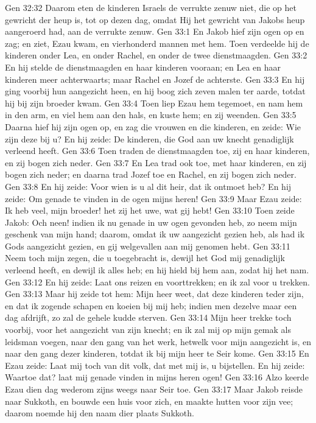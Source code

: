 Gen 32:32  Daarom eten de kinderen Israels de verrukte zenuw niet, die op het gewricht der heup is, tot op dezen dag, omdat Hij het gewricht van Jakobs heup aangeroerd had, aan de verrukte zenuw.
Gen 33:1  En Jakob hief zijn ogen op en zag; en ziet, Ezau kwam, en vierhonderd mannen met hem. Toen verdeelde hij de kinderen onder Lea, en onder Rachel, en onder de twee dienstmaagden.
Gen 33:2  En hij stelde de dienstmaagden en haar kinderen vooraan; en Lea en haar kinderen meer achterwaarts; maar Rachel en Jozef de achterste.
Gen 33:3  En hij ging voorbij hun aangezicht heen, en hij boog zich zeven malen ter aarde, totdat hij bij zijn broeder kwam.
Gen 33:4  Toen liep Ezau hem tegemoet, en nam hem in den arm, en viel hem aan den hals, en kuste hem; en zij weenden.
Gen 33:5  Daarna hief hij zijn ogen op, en zag die vrouwen en die kinderen, en zeide: Wie zijn deze bij u? En hij zeide: De kinderen, die God aan uw knecht genadiglijk verleend heeft.
Gen 33:6  Toen traden de dienstmaagden toe, zij en haar kinderen, en zij bogen zich neder.
Gen 33:7  En Lea trad ook toe, met haar kinderen, en zij bogen zich neder; en daarna trad Jozef toe en Rachel, en zij bogen zich neder.
Gen 33:8  En hij zeide: Voor wien is u al dit heir, dat ik ontmoet heb? En hij zeide: Om genade te vinden in de ogen mijns heren!
Gen 33:9  Maar Ezau zeide: Ik heb veel, mijn broeder! het zij het uwe, wat gij hebt!
Gen 33:10  Toen zeide Jakob: Och neen! indien ik nu genade in uw ogen gevonden heb, zo neem mijn geschenk van mijn hand; daarom, omdat ik uw aangezicht gezien heb, als had ik Gods aangezicht gezien, en gij welgevallen aan mij genomen hebt.
Gen 33:11  Neem toch mijn zegen, die u toegebracht is, dewijl het God mij genadiglijk verleend heeft, en dewijl ik alles heb; en hij hield bij hem aan, zodat hij het nam.
Gen 33:12  En hij zeide: Laat ons reizen en voorttrekken; en ik zal voor u trekken.
Gen 33:13  Maar hij zeide tot hem: Mijn heer weet, dat deze kinderen teder zijn, en dat ik zogende schapen en koeien bij mij heb; indien men dezelve maar een dag afdrijft, zo zal de gehele kudde sterven.
Gen 33:14  Mijn heer trekke toch voorbij, voor het aangezicht van zijn knecht; en ik zal mij op mijn gemak als leidsman voegen, naar den gang van het werk, hetwelk voor mijn aangezicht is, en naar den gang dezer kinderen, totdat ik bij mijn heer te Seir kome.
Gen 33:15  En Ezau zeide: Laat mij toch van dit volk, dat met mij is, u bijstellen. En hij zeide: Waartoe dat? laat mij genade vinden in mijns heren ogen!
Gen 33:16  Alzo keerde Ezau dien dag wederom zijns weegs naar Seir toe.
Gen 33:17  Maar Jakob reisde naar Sukkoth, en bouwde een huis voor zich, en maakte hutten voor zijn vee; daarom noemde hij den naam dier plaats Sukkoth.
